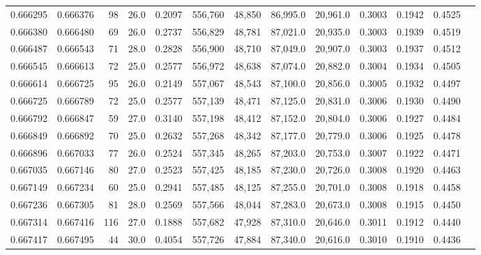 \begin{tabular}{rrrrrrrrrrrrr}
0.666295 & 0.666376 &    98 & 26.0 &                                     0.2097 & 556,760 &  48,850 &  86,995.0 &  20,961.0 & 0.3003 & 0.1942 & 0.4525 \\
0.666380 & 0.666480 &    69 & 26.0 &                                     0.2737 & 556,829 &  48,781 &  87,021.0 &  20,935.0 & 0.3003 & 0.1939 & 0.4519 \\
0.666487 & 0.666543 &    71 & 28.0 &                                     0.2828 & 556,900 &  48,710 &  87,049.0 &  20,907.0 & 0.3003 & 0.1937 & 0.4512 \\
0.666545 & 0.666613 &    72 & 25.0 &                                     0.2577 & 556,972 &  48,638 &  87,074.0 &  20,882.0 & 0.3004 & 0.1934 & 0.4505 \\
0.666614 & 0.666725 &    95 & 26.0 &                                     0.2149 & 557,067 &  48,543 &  87,100.0 &  20,856.0 & 0.3005 & 0.1932 & 0.4497 \\
0.666725 & 0.666789 &    72 & 25.0 &                                     0.2577 & 557,139 &  48,471 &  87,125.0 &  20,831.0 & 0.3006 & 0.1930 & 0.4490 \\
0.666792 & 0.666847 &    59 & 27.0 &                                     0.3140 & 557,198 &  48,412 &  87,152.0 &  20,804.0 & 0.3006 & 0.1927 & 0.4484 \\
0.666849 & 0.666892 &    70 & 25.0 &                                     0.2632 & 557,268 &  48,342 &  87,177.0 &  20,779.0 & 0.3006 & 0.1925 & 0.4478 \\
0.666896 & 0.667033 &    77 & 26.0 &                                     0.2524 & 557,345 &  48,265 &  87,203.0 &  20,753.0 & 0.3007 & 0.1922 & 0.4471 \\
0.667035 & 0.667146 &    80 & 27.0 &                                     0.2523 & 557,425 &  48,185 &  87,230.0 &  20,726.0 & 0.3008 & 0.1920 & 0.4463 \\
0.667149 & 0.667234 &    60 & 25.0 &                                     0.2941 & 557,485 &  48,125 &  87,255.0 &  20,701.0 & 0.3008 & 0.1918 & 0.4458 \\
0.667236 & 0.667305 &    81 & 28.0 &                                     0.2569 & 557,566 &  48,044 &  87,283.0 &  20,673.0 & 0.3008 & 0.1915 & 0.4450 \\
0.667314 & 0.667416 &   116 & 27.0 &                                     0.1888 & 557,682 &  47,928 &  87,310.0 &  20,646.0 & 0.3011 & 0.1912 & 0.4440 \\
0.667417 & 0.667495 &    44 & 30.0 &                                     0.4054 & 557,726 &  47,884 &  87,340.0 &  20,616.0 & 0.3010 & 0.1910 & 0.4436 \\

\end{tabular}
